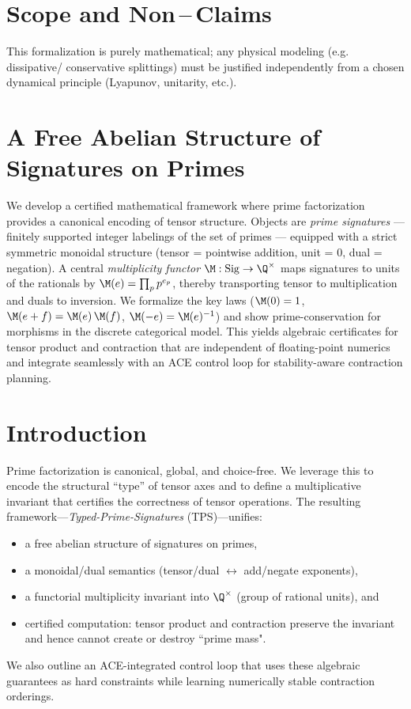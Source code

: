\documentclass[11pt]{article}
\theoremstyle{definition}
\theoremstyle{plain}
\theoremstyle{remark}
\newcommand{\Sig}{\mathrm{Sig}}
\begin{document}
\section{Scope and Non\,–\,Claims}
This formalization is purely mathematical; any physical modeling (e.g. dissipative/ conservative splittings) must be justified independently from a chosen dynamical principle (Lyapunov, unitarity, etc.).

\appendix
\section{A Free Abelian Structure of Signatures on Primes}

We develop a certified mathematical framework where prime factorization provides a canonical encoding of tensor structure. Objects are \emph{prime signatures} --- finitely supported integer labelings of the set of primes --- equipped with a strict symmetric monoidal structure (tensor = pointwise addition, unit = $0$, dual = negation). A central \emph{multiplicity functor} $\M:\Sig\to \Q^{\times}$ maps signatures to units of the rationals by $\M(e)=\prod_{p} p^{e_p}$, thereby transporting tensor to multiplication and duals to inversion. We formalize the key laws ($\M(0)=1$, $\M(e+f)=\M(e)\,\M(f)$, $\M(-e)=\M(e)^{-1}$) and show prime-conservation for morphisms in the discrete categorical model. This yields algebraic certificates for tensor product and contraction that are independent of floating-point numerics and integrate seamlessly with an ACE control loop for stability-aware contraction planning.

\section{Introduction}
\label{sec:intro}
Prime factorization is canonical, global, and choice-free. We leverage this to encode the structural ``type'' of tensor axes and to define a multiplicative invariant that certifies the correctness of tensor operations. The resulting framework---\emph{Typed-Prime-Signatures} (TPS)---unifies:
\begin{itemize}[leftmargin=*]
  \item a free abelian structure of signatures on primes,
  \item a monoidal/dual semantics (tensor/dual $\leftrightarrow$ add/negate exponents),
  \item a functorial multiplicity invariant into $\Q^{\times}$ (group of rational units), and
  \item certified computation: tensor product and contraction preserve the invariant and hence cannot create or destroy ``prime mass".
\end{itemize}
We also outline an ACE-integrated control loop that uses these algebraic guarantees as hard constraints while learning numerically stable contraction orderings.
\end{document}
